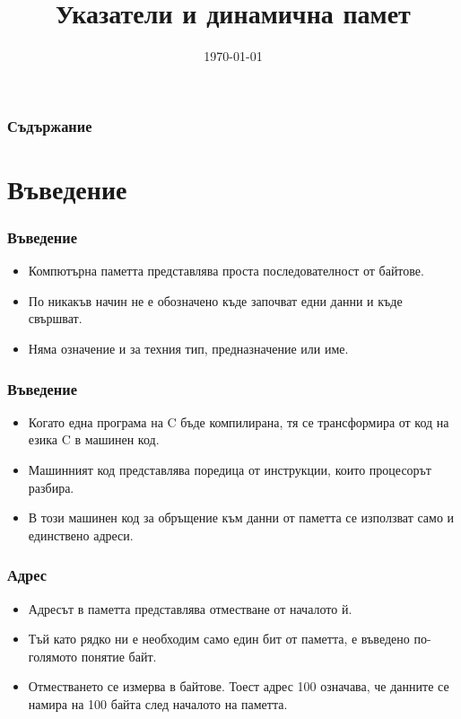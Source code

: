 \documentclass[ignorenonframetext, hyperref=unicode]{beamer}
\title[Указатели и динамична памет]{Указатели и динамична памет}
\date{\today}
\begin{document}
\frame{\maketitle}

\begin{frame}
\frametitle{Съдържание}
\tableofcontents %
\end{frame}

\section{Въведение}

\begin{frame}
\frametitle{Въведение}
\begin{itemize}
  \item Компютърна паметта представлява проста последователност от байтове.
  \item По никакъв начин не е обозначено къде започват едни данни и къде свършват.
  \item Няма означение и за техния тип, предназначение или име.
\end{itemize}
\end{frame}

\begin{frame}
\frametitle{Въведение}
\begin{itemize}
  \item Когато една програма на C бъде компилирана, тя се трансформира от код на езика C в машинен код.
  \item Машинният код представлява поредица от инструкции, които процесорът разбира.
  \item В този машинен код за обръщение към данни от паметта се използват само и единствено адреси.
\end{itemize}
\end{frame}

\begin{frame}
\frametitle{Адрес}
\begin{itemize}
  \item Адресът в паметта представлява отместване от началото й.
  \item Тъй като рядко ни е необходим само един бит от паметта, е въведено по-голямото понятие байт.
  \item Отместването се измерва в байтове. Тоест адрес 100 означава, че данните се намира на 100 байта след началото на паметта.
\end{itemize}
\end{frame}
\end{document}
